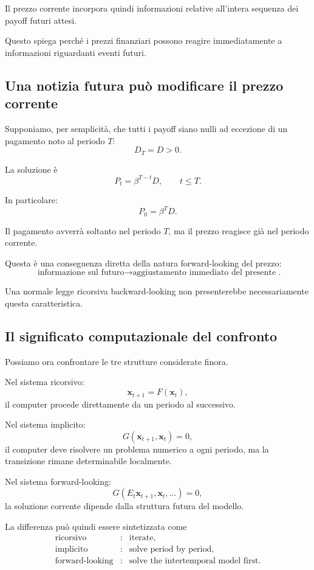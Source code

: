\documentclass{book}
\begin{document}
Il prezzo corrente incorpora quindi informazioni relative all'intera
sequenza dei payoff futuri attesi.

Questo spiega perché i prezzi finanziari possono reagire immediatamente a
informazioni riguardanti eventi futuri.


\subsection{Una notizia futura può modificare il prezzo corrente}

Supponiamo, per semplicità, che tutti i payoff siano nulli ad eccezione
di un pagamento noto al periodo $T$:
\[
D_T=D>0.
\]

La soluzione è
\[
P_t
=
\beta^{T-t}D,
\qquad t\leq T.
\]

In particolare:
\[
P_0=\beta^T D.
\]

Il pagamento avverrà soltanto nel periodo $T$, ma il prezzo reagisce già
nel periodo corrente.

Questa è una conseguenza diretta della natura forward-looking del prezzo:
\[
\boxed{
\text{informazione sul futuro}
\longrightarrow
\text{aggiustamento immediato del presente}
}.
\]

Una normale legge ricorsiva backward-looking non presenterebbe
necessariamente questa caratteristica.


\subsection{Il significato computazionale del confronto}

Possiamo ora confrontare le tre strutture considerate finora.

Nel sistema ricorsivo:
\[
\mathbf{x}_{t+1}=F(\mathbf{x}_t),
\]
il computer procede direttamente da un periodo al successivo.

Nel sistema implicito:
\[
G(\mathbf{x}_{t+1},\mathbf{x}_t)=0,
\]
il computer deve risolvere un problema numerico a ogni periodo, ma la
transizione rimane determinabile localmente.

Nel sistema forward-looking:
\[
G(E_t\mathbf{x}_{t+1},\mathbf{x}_t,\ldots)=0,
\]
la soluzione corrente dipende dalla struttura futura del modello.

La differenza può quindi essere sintetizzata come
\[
\boxed{
\begin{array}{rcl}
\text{ricorsivo}
&:&
\text{iterate},\\[1mm]
\text{implicito}
&:&
\text{solve period by period},\\[1mm]
\text{forward-looking}
&:&
\text{solve the intertemporal model first}.
\end{array}
}
\]
\end{document}
